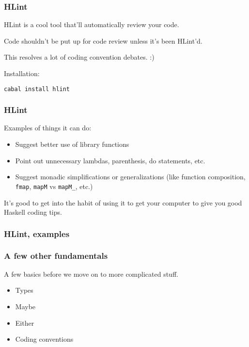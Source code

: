 \documentclass{beamer}
\begin{document}
\begin{frame}[fragile]
\frametitle{HLint}

HLint is a cool tool that'll automatically review your code.

\bigskip
Code shouldn't be put up for code review unless it's been HLint'd.

This resolves a lot of coding convention debates. :)

\bigskip
Installation:
\begin{verbatim}
cabal install hlint
\end{verbatim}

\end{frame}


\begin{frame}[fragile]
\frametitle{HLint}

Examples of things it can do:

\begin{itemize}
  \item Suggest better use of library functions
  \item Point out unnecessary lambdas, parenthesis, do statements, etc.
  \item Suggest monadic simplifications or generalizations (like
    function composition, \verb+fmap+, \verb+mapM+ vs \verb+mapM_+, etc.)
\end{itemize}
\bigskip

It's good to get into the habit of using it to get your computer to
give you good Haskell coding tips.

\end{frame}


\begin{frame}[fragile]
\frametitle{HLint, examples}



\end{frame}


\begin{frame}[fragile]
\frametitle{A few other fundamentals}

A few basics before we move on to more complicated stuff.

\begin{itemize}
\item Types
\item Maybe
\item Either
\item Coding conventions
\end{itemize}
\end{frame}
\end{document}
